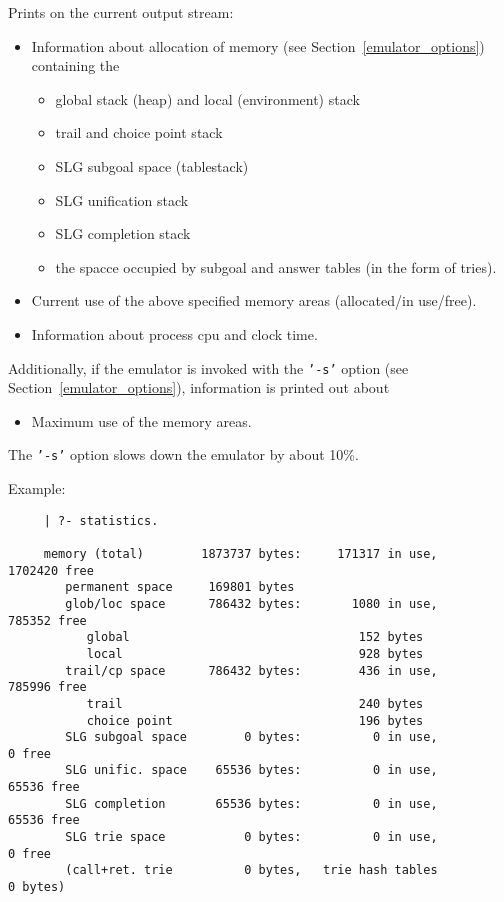 \begin{description}
    Prints on the current output stream:
    \begin{itemize}
    \item Information about allocation of memory 
	  (see Section~\ref{emulator_options}) containing the 
          \begin{itemize}
          \item global stack (heap) and local (environment) stack
          \item trail and choice point stack
	  \item SLG subgoal space (tablestack)
          \item SLG unification stack
          \item SLG completion stack
	  \item the spacce occupied by subgoal and answer tables
		(in the form of tries).
          \end{itemize}
    \item Current use of the above specified memory areas
		(allocated/in use/free).
    \item Information about process cpu and clock time.
    \end{itemize}

    Additionally, if the emulator is invoked with the {\tt '-s'} option
    (see Section~\ref{emulator_options}), information is printed out about
    \begin{itemize}
    \item Maximum use of the memory areas.
    \end{itemize}
    The {\tt '-s'} option slows down the emulator by about 10\%.

    Example:
    {\footnotesize
     \begin{verbatim}
     | ?- statistics.

     memory (total)        1873737 bytes:     171317 in use,    1702420 free
        permanent space     169801 bytes
        glob/loc space      786432 bytes:       1080 in use,     785352 free
           global                                152 bytes
           local                                 928 bytes
        trail/cp space      786432 bytes:        436 in use,     785996 free
           trail                                 240 bytes
           choice point                          196 bytes
        SLG subgoal space        0 bytes:          0 in use,          0 free
        SLG unific. space    65536 bytes:          0 in use,      65536 free
        SLG completion       65536 bytes:          0 in use,      65536 free
        SLG trie space           0 bytes:          0 in use,          0 free
        (call+ret. trie          0 bytes,   trie hash tables          0 bytes)


\end{verbatim}}
\end{description}
